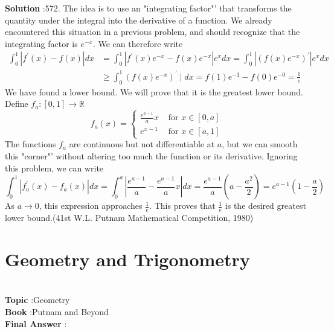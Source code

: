 \documentclass[10pt]{article}
\begin{document}
\textbf{Solution} :572. The idea is to use an "integrating factor"' that transforms the quantity under the integral into the derivative of a function. We already encountered this situation in a previous problem, and should recognize that the integrating factor is $e^{-x}$. We can therefore write$$ \begin{aligned} \int_{0}^{1}\left|f^{\prime}(x)-f(x)\right| d x &=\int_{0}^{1}\left|f^{\prime}(x) e^{-x}-f(x) e^{-x}\right| e^{x} d x=\int_{0}^{1}\left|\left(f(x) e^{-x}\right)^{\prime}\right| e^{x} d x \\ & \geq \int_{0}^{1}\left(f(x) e^{-x}\right)^{\prime} \mid d x=f(1) e^{-1}-f(0) e^{-0}=\frac{1}{e} \end{aligned} $$We have found a lower bound. We will prove that it is the greatest lower bound. Define $f_{a}:[0,1] \rightarrow \mathbb{R}$$$ f_{a}(x)= \begin{cases}\frac{e^{a-1}}{a} x & \text { for } x \in[0, a] \\ e^{x-1} & \text { for } x \in[a, 1]\end{cases} $$The functions $f_{a}$ are continuous but not differentiable at $a$, but we can smooth this "corner"' without altering too much the function or its derivative. Ignoring this problem, we can write$$ \int_{0}^{1}\left|f_{a}^{\prime}(x)-f_{a}(x)\right| d x=\int_{0}^{a}\left|\frac{e^{a-1}}{a}-\frac{e^{a-1}}{a} x\right| d x=\frac{e^{a-1}}{a}\left(a-\frac{a^{2}}{2}\right)=e^{a-1}\left(1-\frac{a}{2}\right) $$As $a \rightarrow 0$, this expression approaches $\frac{1}{e}$. This proves that $\frac{1}{e}$ is the desired greatest lower bound.(41st W.L. Putnam Mathematical Competition, 1980) \section{Geometry and Trigonometry}\\
\textbf{Topic} :Geometry\\
\textbf{Book} :Putnam and Beyond\\
\textbf{Final Answer} :\\
\end{document}
